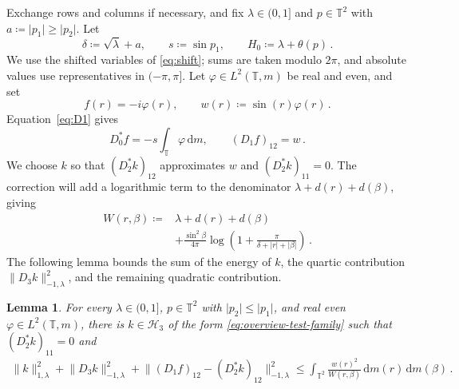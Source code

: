 \documentclass[11pt]{amsart}
\theoremstyle{plain}
\newtheorem{lemma}[theorem]{Lemma}
\theoremstyle{definition}
\newcommand{\T}{\mathbb T}
\newcommand{\1}{\mathbf 1}
\newcommand{\norm}[1]{\lVert #1\rVert}
\newcommand{\abs}[1]{\lvert #1\rvert}
\newcommand{\dd}{\,\mathrm d}
\newcommand{\Hs}{\mathcal H}
\newcommand{\Hminus}[1]{\norm{#1}_{-1,\lambda}}
\newcommand{\Hplus}[1]{\norm{#1}_{1,\lambda}}
\begin{document}
	Exchange rows and columns if necessary, and fix
	$\lambda\in(0,1]$ and $p\in\T^2$ with
	$a\coloneqq\abs{p_1}\geq\abs{p_2}$.
	Let
	\begin{equation}\label{eq:degree-one-parameters}
		\delta\coloneqq\sqrt\lambda+a,\qquad
		s\coloneqq\sin p_1,\qquad H_0\coloneqq\lambda+\theta(p)\, .
	\end{equation}
	We use the shifted variables of \eqref{eq:shift}; sums are taken modulo
	$2\pi$, and absolute values use representatives in $(-\pi,\pi]$.
	Let $\varphi\in L^2(\T,m)$ be real and even, and set
	\begin{equation}\label{eq:f}
		f(r)=-i\varphi(r),\qquad w(r)\coloneqq\sin(r)\varphi(r)\, .
	\end{equation}
	Equation~\eqref{eq:D1} gives
	\begin{equation}\label{eq:degree-one-images}
		D_0^*f=-s\int_\T\varphi\dd m,\qquad (D_1f)_{12}=w\, .
	\end{equation}
	We choose $k$ so that $(D_2^*k)_{12}$ approximates $w$ and
	$(D_2^*k)_{11}=0$.  The correction will add a logarithmic
	term to the denominator $\lambda+d(r)+d(\beta)$, giving
	\begin{equation}\label{eq:mixed-weight}
		\begin{split}
			W(r,\beta)\coloneqq{}&\lambda+d(r)+d(\beta)\\
			&+\frac{\sin^2\beta}{4\pi}
			\log\left(1+\frac\pi{\delta+\abs r+\abs\beta}\right)\, .
		\end{split}
	\end{equation}
	The following lemma bounds the sum of the energy of $k$, the quartic
	contribution $\Hminus{D_3k}^2$, and the remaining quadratic contribution.
	
	\begin{lemma}\label{lem:parity}
		For every $\lambda\in(0,1]$, $p\in\T^2$ with
		$\abs{p_2}\leq\abs{p_1}$, and real even
		$\varphi\in L^2(\T,m)$, there is $k\in\Hs_3$ of the form
		\eqref{eq:overview-test-family} such that
		$(D_2^*k)_{11}=0$ and
		\begin{equation}\label{eq:correction-cost}
			\begin{split}
				\Hplus k^2+\Hminus{D_3k}^2
				+\Hminus{(D_1f)_{12}-(D_2^*k)_{12}}^2
				\leq\int_{\T^2}\frac{w(r)^2}{W(r,\beta)}
				\dd m(r)\dd m(\beta)\, .
			\end{split}
		\end{equation}
	\end{lemma}
	
\end{document}
